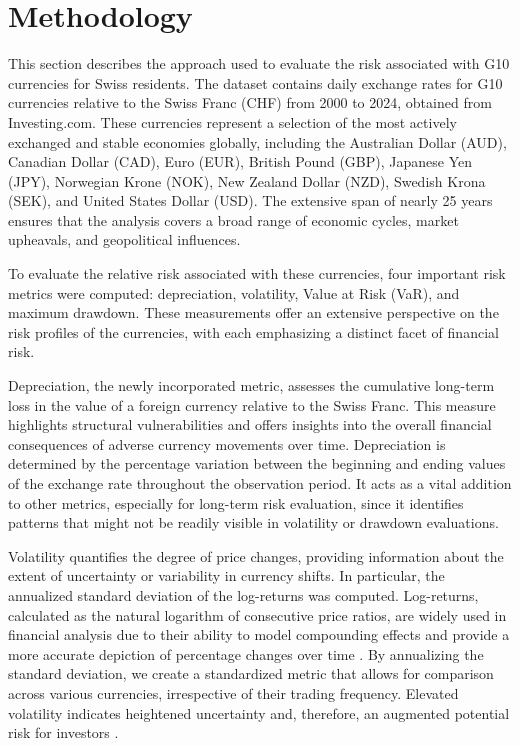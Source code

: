 \documentclass[11pt,a4paper,english,oneside]{book}
\begin{document}
\chapter{Methodology}
This section describes the approach used to evaluate the risk associated with G10 currencies for Swiss residents. The dataset contains daily exchange rates for G10 currencies relative to the Swiss Franc (CHF) from 2000 to 2024, obtained from Investing.com. These currencies represent a selection of the most actively exchanged and stable economies globally, including the Australian Dollar (AUD), Canadian Dollar (CAD), Euro (EUR), British Pound (GBP), Japanese Yen (JPY), Norwegian Krone (NOK), New Zealand Dollar (NZD), Swedish Krona (SEK), and United States Dollar (USD). The extensive span of nearly 25 years ensures that the analysis covers a broad range of economic cycles, market upheavals, and geopolitical influences.

To evaluate the relative risk associated with these currencies, four important risk metrics were computed: depreciation, volatility, Value at Risk (VaR), and maximum drawdown. These measurements offer an extensive perspective on the risk profiles of the currencies, with each emphasizing a distinct facet of financial risk.

Depreciation, the newly incorporated metric, assesses the cumulative long-term loss in the value of a foreign currency relative to the Swiss Franc. This measure highlights structural vulnerabilities and offers insights into the overall financial consequences of adverse currency movements over time. Depreciation is determined by the percentage variation between the beginning and ending values of the exchange rate throughout the observation period. It acts as a vital addition to other metrics, especially for long-term risk evaluation, since it identifies patterns that might not be readily visible in volatility or drawdown evaluations.

Volatility quantifies the degree of price changes, providing information about the extent of uncertainty or variability in currency shifts. In particular, the annualized standard deviation of the log-returns was computed. Log-returns, calculated as the natural logarithm of consecutive price ratios, are widely used in financial analysis due to their ability to model compounding effects and provide a more accurate depiction of percentage changes over time \parencite{scrucca2024entropy}. By annualizing the standard deviation, we create a standardized metric that allows for comparison across various currencies, irrespective of their trading frequency. Elevated volatility indicates heightened uncertainty and, therefore, an augmented potential risk for investors \parencite{kongsilp2017volatility}.
\end{document}
